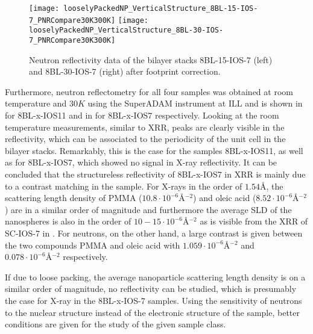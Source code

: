 \documentclass[\main/dresen_thesis.tex]{subfiles}
\begin{document}
  \begin{figure}[tb]
    \centering
    \texttt{[image: looselyPackedNP\_VerticalStructure\_8BL-15-IOS-7\_PNRCompare30K300K]}
    \texttt{[image: looselyPackedNP\_VerticalStructure\_8BL-30-IOS-7\_PNRCompare30K300K]}
    \caption{\label{fig:looselyPackedNS:bilayerStacks:nr300K8BLIOS7}Neutron reflectivity data of the bilayer stacks 8BL-15-IOS-7 (left) and 8BL-30-IOS-7 (right) after footprint correction.}
  \end{figure}

  Furthermore, neutron reflectometry for all four samples was obtained at room temperature and $30 \unit{K}$ using the SuperADAM instrument at ILL and is shown in  for 8BL-x-IOS11 and in  for 8BL-x-IOS7 respectively.
  Looking at the room temperature measurements, similar to XRR, peaks are clearly visible in the reflectivity, which can be associated to the periodicity of the unit cell in the bilayer stacks.
  Remarkably, this is the case for the samples 8BL-x-IOS11, as well as for 8BL-x-IOS7, which showed no signal in X-ray reflectivity.
  It can be concluded that the structureless reflectivity of 8BL-x-IOS7 in XRR is mainly due to a contrast matching in the sample.
  For X-rays in the order of $1.54 \unit{\angstrom}$, the scattering length density of PMMA ($10.8 \cdot \unit{10^{-6} \angstrom^{-2}}$) and oleic acid ($8.52 \cdot \unit{10^{-6} \angstrom^{-2}}$) are in a similar order of magnitude and furthermore the average SLD of the nanospheres is also in the order of $10 - 15 \cdot \unit{10^{-6} \angstrom^{-2}}$ as is visible from the XRR of SC-IOS-7 in .
  For neutrons, on the other hand, a large contrast is given between the two compounds PMMA and oleic acid with $1.059 \cdot \unit{10^{-6} \angstrom^{-2}}$ and $0.078 \cdot \unit{10^{-6} \angstrom^{-2}}$ respectively.
  
  If due to loose packing, the average nanoparticle scattering length density is on a similar order of magnitude, no reflectivity can be studied, which is presumably the case for X-ray in the 8BL-x-IOS-7 samples.
  Using the sensitivity of neutrons to the nuclear structure instead of the electronic structure of the sample, better conditions are given for the study of the given sample class.
\end{document}
